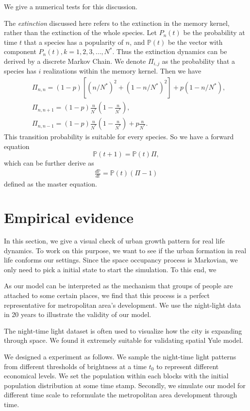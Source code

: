 \documentclass[aps,prl]{revtex4-1}
\begin{document}
We give a numerical tests for this discussion. 

The \emph{extinction} discussed here refers to the extinction in the memory kernel, rather than the extinction of the whole species. Let $P_n(t)$ be the probability at time $t$ that a species has a popularity of $n$, and $\mathbb{P}(t)$ be the vector with component $P_n(t),k = 1,2,3,\dots,N^*$. Thus the extinction dynamics can be derived by a discrete Markov Chain. We denote $\Pi_{i,j}$ as the probability that a species has $i$ realizations within the memory kernel. Then we have \begin{align*}
&\Pi_{n,n} = (1-p)[(n/N^*)^2+(1-n/N^*)^2]+p(1-n/N^*),\\
&\Pi_{n,n+1}=(1-p)\frac{n}{N^*}(1-\frac{n}{N^*}),\\ 
&\Pi_{n,n-1}=(1-p)\frac{n}{N^*}(1-\frac{n}{N^*})+p\frac{n}{N^*}.
\end{align*}
This transition probability is suitable for every species. So we have a forward equation $$ \mathbb{P}(t+1) = \mathbb{P}(t)\Pi, $$which can be further derive as \begin{align*}
\frac{d\mathbb{P}}{dt} = \mathbb{P}(t)(\Pi-1)
\end{align*}
defined as the master equation. 


\section{Empirical evidence}

In this section, we give a visual check of urban growth pattern for real life dynamics. To work on this purpose, we want to see if the urban formation in real life conforms our settings. Since the space occupancy process is Markovian, we only need to pick a initial state to start the simulation. To this end, we 

As our model can be interpreted as the mechanism that groups of people are attached to some certain places, we find that this process is a perfect representative for metropolitan area's development. We use the night-light data in 20 years to illustrate the validity of our model. 

The night-time light dataset is often used to visualize how the city is expanding through space. We found it extremely suitable for validating spatial Yule model. 

We designed a experiment as follows. We sample the night-time light patterns from different thresholds of brightness at a time $t_0$ to represent different economical levels. We set the population within each blocks with the initial population distribution at some time stamp. Secondly, we simulate our model for different time scale to reformulate the metropolitan area development through time. 



    
\end{document}
